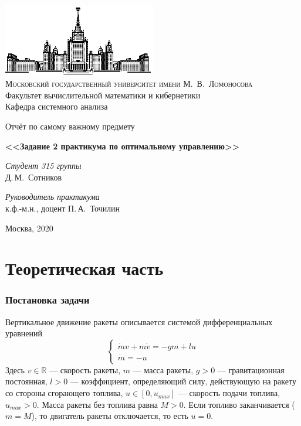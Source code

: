 \documentclass[16pt]{article}
\newcommand\Real{\mathbb{R}}
\begin{document}
\thispagestyle{empty}

\begin{center}
\ \vspace{-3cm}

\includegraphics[width=0.5\textwidth]{msu.eps}\\
{\scshape Московский государственный университет имени М.~В.~Ломоносова}\\
Факультет вычислительной математики и кибернетики\\
Кафедра системного анализа

\vfill

{\LARGE Отчёт по самому важному предмету}

\vspace{1cm}

{\Huge\bfseries <<Задание 2 практикума по оптимальному управлению>>}
\end{center}

\vspace{1cm}

\begin{flushright}
  \large
  \textit{Студент 315 группы}\\
  Д.\,М.~Сотников

  \vspace{5mm}

  \textit{Руководитель практикума}\\
  к.ф.-м.н., доцент П.\,А.~Точилин
\end{flushright}

\vfill

\begin{center}
Москва, 2020
\end{center}

\newpage
\tableofcontents
\newpage
\part{Теоретическая часть}
\section{Постановка задачи}
Вертикальное движение ракеты описывается системой дифференциальных уравнений
\begin{equation}
\begin{cases} \label{task_ode}
\dot{m}v + m\dot{v} = -gm + lu \\
\dot{m} = -u
\end{cases}
\end{equation}
Здесь $v \in \Real$ --- скорость ракеты, $m$ --- масса ракеты, $g > 0$ --- гравитационная постоянная,
$l > 0$ --- коэффициент, определяющий силу, действующую на ракету со стороны сгорающего топлива,
$u \in [0, u_{max}]$ --- скорость подачи топлива, $u_{max} > 0$. Масса ракеты без топлива равна $M > 0$.
Если топливо заканчивается ($m = M$), то двигатель ракеты отключается, то есть $u = 0$.
\end{document}
